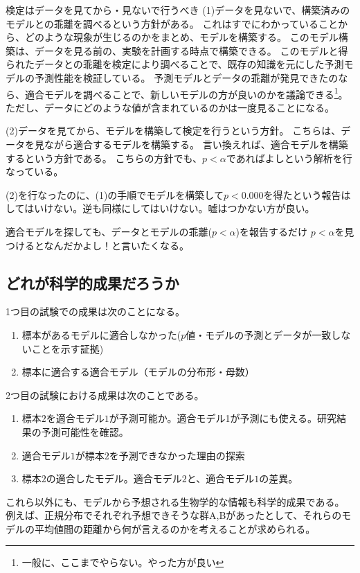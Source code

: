 \begin{SMbox}{検定はデータを見てから・見ないで行うべき}
    (1)データを見ないで、構築済みのモデルとの乖離を調べるという方針がある。
    これはすでにわかっていることから、どのような現象が生じるのかをまとめ、モデルを構築する。
    このモデル構築は、データを見る前の、実験を計画する時点で構築できる。
    このモデルと得られたデータとの乖離を検定により調べることで、既存の知識を元にした予測モデルの予測性能を検証している。
    予測モデルとデータの乖離が発見できたのなら、適合モデルを調べることで、新しいモデルの方が良いのかを議論できる\footnote{一般に、ここまでやらない。やった方が良い}。
    ただし、データにどのような値が含まれているのかは一度見ることになる。

    (2)データを見てから、モデルを構築して検定を行うという方針。
    こちらは、データを見ながら適合するモデルを構築する。
    言い換えれば、適合モデルを構築するという方針である。
    こちらの方針でも、$p<\alpha$であればよしという解析を行なっている。
    

    (2)を行なったのに、(1)の手順でモデルを構築して$p<0.000$を得たという報告はしてはいけない。逆も同様にしてはいけない。嘘はつかない方が良い。
\end{SMbox}

\begin{SMbox}{適合モデルを探しても、データとモデルの乖離($p<\alpha$)を報告するだけ}
    $p<\alpha$を見つけるとなんだかよし！と言いたくなる。
\end{SMbox}


\subsection{どれが科学的成果だろうか}
1つ目の試験での成果は次のことになる。
\begin{enumerate}
    \item 標本があるモデルに適合しなかった($p$値・モデルの予測とデータが一致しないことを示す証拠)
    \item 標本に適合する適合モデル（モデルの分布形・母数）
\end{enumerate}

2つ目の試験における成果は次のことである。
\begin{enumerate}
    \item 標本$2$を適合モデル$1$が予測可能か。適合モデル1が予測にも使える。研究結果の予測可能性を確認。
    \item 適合モデル$1$が標本$2$を予測できなかった理由の探索
    \item 標本$2$の適合したモデル。適合モデル$2$と、適合モデル$1$の差異。
\end{enumerate}
これら以外にも、モデルから予想される生物学的な情報も科学的成果である。
例えば、正規分布でそれぞれ予想できそうな群A,Bがあったとして、それらのモデルの平均値間の距離から何が言えるのかを考えることが求められる。



